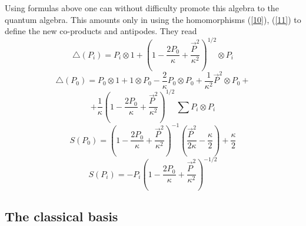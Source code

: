 \documentclass[a4paper,a4paper]{article}
\begin{document}
 Using  formulas above one can without difficulty promote this algebra to the quantum algebra. This
 amounts only in using the homomorphisms (\ref{10}), (\ref{11}) to define the new co-products and antipodes. They read
\begin{equation}\label{6s}
  \triangle(P_{i})=P_{i} \otimes 1 + \left(1 - \frac{2P_{0}}{\kappa} +
   \frac{\vec{P}^{2}}{\kappa^{2}}\right)^{{1}/{2}} \otimes P_{i}
\end{equation}
$$
  \triangle(P_{0})=P_{0} \otimes 1 + 1 \otimes P_{0} -
  \frac{2}{\kappa}P_{0} \otimes P_{0} + \frac{1}{\kappa^{2}}
   \vec{P}^{2}\otimes P_{0} +
$$
\begin{equation}\label{7s}
   + \frac{1}{\kappa} \left(1 - \frac{2P_{0}}{\kappa} +
   \frac{\vec{P}^{2}}{\kappa^{2}}\right)^{{1}/{2}} \, \sum P_{i}\otimes P_{i}
\end{equation}
\begin{equation}\label{8s}
    S(P_{0})=\left(1 - \frac{2P_{0}}{\kappa} + \frac{\vec{P}^{2}}{\kappa^{2}}\right)^{-1}
  \left(\frac{\vec{P}^{2}}{2\kappa} - \frac{\kappa}{2}\right) + \frac{\kappa}{2}
\end{equation}
\begin{equation}\label{9s}
  S(P_{i})=-P_{i}\left(1 - \frac{2P_{0}}{\kappa} + \frac{\vec{P}^{2}}{\kappa^{2}}\right)^{-1/2}
\end{equation}


\subsection{The classical basis}
\end{document}
